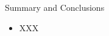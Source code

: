 \begin{frame}{Summary and Conclusions}
  \begin{itemize}
    \item XXX
  \end{itemize}
\endblock{}    
\end{frame}
